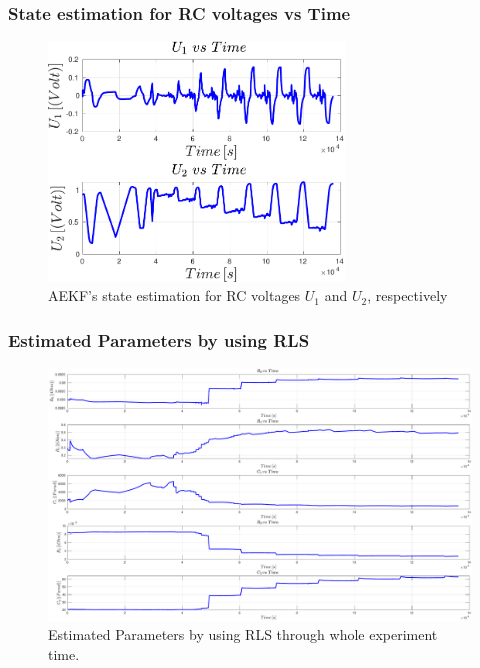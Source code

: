 \documentclass{beamer}
\begin{document}
\begin{frame}
	
	\frametitle{State estimation for RC voltages vs Time}
	
	\begin{figure}
		\centering
		\includegraphics[width=0.7\textwidth, keepaspectratio]{images/AEKF_RC_Voltages.pdf}
		\caption{AEKF's state estimation for RC voltages $U_{1}$ and $U_{2}$, respectively }
		\label{fig:The_AEKF_RC_Voltages}
	\end{figure}
\end{frame}

\begin{frame}
	
	\frametitle{Estimated Parameters by using RLS}
	
	\begin{figure}
		\centering
		\includegraphics[width=1.0\textwidth, keepaspectratio]{images/RLS_Results_With_AEKF.pdf}
		\caption{Estimated Parameters by using RLS through whole experiment time.}
		\label{fig:RLS_Results_With_AEKF}
	\end{figure}
\end{frame}


\end{document}
